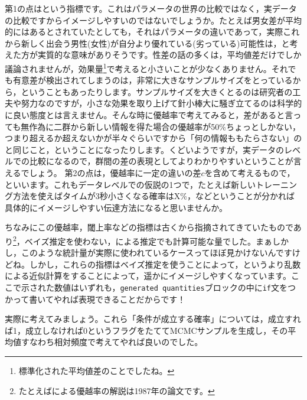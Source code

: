 \documentclass{ltjsbook}
\begin{document}
第1の点はという指標です。これはパラメータの世界の比較ではなく，実データの比較ですからイメージしやすいのではないでしょうか。たとえば男女差が平均的にはあるとされていたとしても，それはパラメータの違いであって，実際これから新しく出会う男性(女性)が自分より優れている(劣っている)可能性は，と考えた方が実質的な意味がありそうです。性差の話の多くは，平均値差だけでしか議論されませんが，効果量\footnote{標準化された平均値差のことでしたね。}で考えると小さいことが少なくありません。それでも有意差が検出されてしまうのは，非常に大きなサンプルサイズをとっているから，ということもあったりします。サンプルサイズを大きくとるのは研究者の工夫や努力なのですが，小さな効果を取り上げて針小棒大に騒ぎ立てるのは科学的に良い態度とは言えません。そんな時に優越率で考えてみると，差があると言っても無作為に二群から新しい情報を得た場合の優越率が50\%ちょっとしかない，つまり超えるか超えないかが半々ぐらいですから「何の情報ももたらさない」のと同じこと，ということになったりします。くどいようですが，実データのレベルでの比較になるので，群間の差の表現としてよりわかりやすいということが言えるでしょう。
第2の点は，優越率に一定の違いの差$c$を含めて考えるもので，といいます。これもデータレベルでの仮説の1つで，たとえば新しいトレーニング方法を使えばタイムが3秒小さくなる確率はX\%，などということが分かれば具体的にイメージしやすい伝達方法になると思いませんか。

ちなみにこの優越率，閾上率などの指標は古くから指摘されてきていたものであり\footnote{たとえば\textcite{Haebara1987}による優越率の解説は1987年の論文です。}，ベイズ推定を使わない，による推定でも計算可能な量でした。まぁしかし，このような統計量が実際に使われているケースってほぼ見かけないんですけどね。しかし，これらの指標はベイズ推定を使うことによって，というより乱数による近似計算をすることによって，遥かにイメージしやすくなっています。ここで示された数値はいずれも，\verb|generated quantities|ブロックの中に\verb|if|文をつかって書いてやれば表現できることだからです！

実際に考えてみましょう。これら「条件が成立する確率」については，成立すれば1，成立しなければ0というフラグをたててMCMCサンプルを生成し，その平均値すなわち相対頻度で考えてやれば良いのでした。
\end{document}
